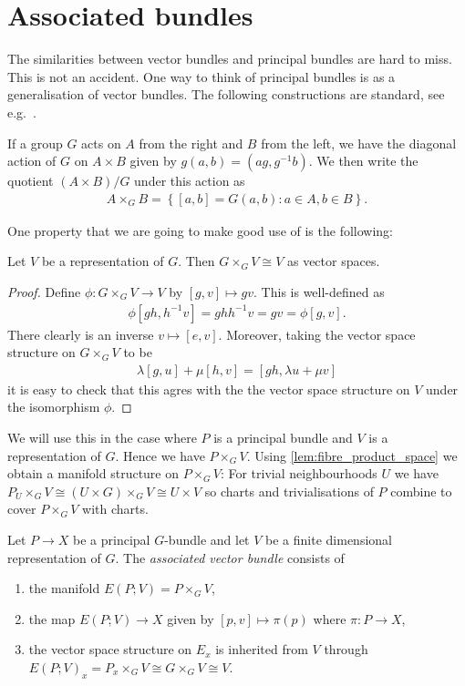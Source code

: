 \documentclass{article}
\begin{document}
\section{Associated bundles}

The similarities between vector bundles and principal bundles are
hard to miss. This is not an accident. One way to think of principal
bundles is as a generalisation of vector bundles. The following
constructions are standard, see e.g.~\cite{mitchell2001}.

If a group $G$ acts on $A$ from the right and $B$ from the left, we have the
diagonal action of $G$ on $A\times B$ given by $g(a,b)=(ag,{g}^{-1}b)$. We then write the quotient $(A\times B)/G$ under this action as
\begin{align*}
  A\times_G B = \left\lbrace{[a,b]=G(a,b) : a\in A, b\in B}\right\rbrace.
\end{align*}

One property that we are going to make good use of is the following:
\begin{lemma}\label{lem:fibre_product_space}
  Let $V$ be a representation of $G$. Then $G\times_G V \cong V$
  as vector spaces.
  \begin{proof}
    Define $\phi:G\times_G V\to V$ by $[g,v]\mapsto gv$. This is well-defined
    as
    \begin{align*}
      \phi[gh,{h}^{-1}v]=gh{h}^{-1}v=gv=\phi[g,v].
    \end{align*}
    There clearly is an inverse $v\mapsto [e,v]$. Moreover,
    taking the vector space structure on $G\times_G V$ to be
    \begin{align}\label{eq:fibre_product_space}
      \lambda[g,u] + \mu[h,v] = [gh,\lambda u + \mu v]
    \end{align}
    it is easy to check that this agres with the the vector space
    structure on $V$ under the isomorphism $\phi$.
  \end{proof}
\end{lemma}
We will use this in the case where $P$ is a principal bundle and $V$ is
a representation of $G$. Hence we have $P\times_G V$. Using
\ref{lem:fibre_product_space} we obtain a manifold structure on
$P\times_G V$: For trivial neighbourhoods $U$ we have
$P_U\times_G V\cong (U\times G)\times_G V\cong U\times V$
so charts and trivialisations of $P$ combine to cover $P\times_G V$
with charts.

\begin{definition}
  Let $P\to X$ be a principal $G$-bundle and let $V$ be a finite dimensional
  representation of $G$. The \emph{associated vector bundle} consists of
  \begin{enumerate}
    \item the manifold $E(P;V)=P\times_G V$,
    \item the map $E(P;V)\to X$ given by $[p,v]\mapsto \pi(p)$
      where $\pi:P\to X$,
    \item the vector space structure on $E_x$ is inherited
      from $V$ through $E(P;V)_x = P_x \times_G V \cong G\times_G V \cong V$.
  \end{enumerate}
\end{definition}
\end{document}
